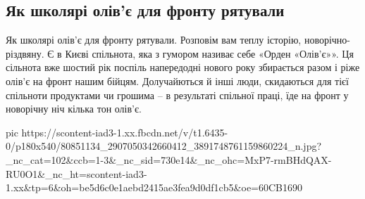  
 
 
 
 
\subsection{Як школярі олів'є для фронту рятували}

Як школярі олів'є для фронту рятували.
Розповім вам теплу історію, новорічно-різдвяну. 
Є в Києві спільнота, яка з гумором називає себе «Орден «Олів’є»». Ця сільнота вже шостий рік поспіль напередодні нового року збирається разом і ріже олів’є на фронт нашим бійцям. Долучайються й інші люди, скидаються для тієї спільноти продуктами чи грошима – в результаті спільної праці, їде на фронт у новорічну ніч кілька тон олів’є.

\ifcmt
  pic https://scontent-iad3-1.xx.fbcdn.net/v/t1.6435-0/p180x540/80851134_2907050342660412_3891748761159860224_n.jpg?_nc_cat=102&ccb=1-3&_nc_sid=730e14&_nc_ohc=MxP7-rmBHdQAX-RU0O1&_nc_ht=scontent-iad3-1.xx&tp=6&oh=be5d6c0e1aebd2415ae3fea9d0df1cb5&oe=60CB1690
\fi


